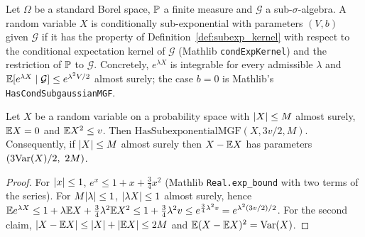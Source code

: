 \begin{definition}\label{def:subexp_cond}
\leanok
{}
Let $\Omega$ be a standard Borel space, $\mathbb{P}$ a finite measure and $\mathcal G$ a
sub-$\sigma$-algebra. A random variable $X$ is conditionally sub-exponential with parameters
$(V,b)$ given $\mathcal G$ if it has the property of Definition~\ref{def:subexp_kernel} with
respect to the conditional expectation kernel of $\mathcal G$ (Mathlib
\texttt{condExpKernel}) and the restriction of $\mathbb{P}$ to $\mathcal G$. Concretely,
$e^{\lambda X}$ is integrable for every admissible $\lambda$ and
$\mathbb{E}[e^{\lambda X}\mid\mathcal G] \le e^{\lambda^2V/2}$ almost surely; the case $b = 0$ is
Mathlib's \texttt{HasCondSubgaussianMGF}.
\end{definition}

\begin{lemma}\label{lem:bernstein_condition}
\leanok
{}
Let $X$ be a random variable on a probability space with $\lvert X \rvert \le M$ almost surely,
$\mathbb{E} X = 0$ and $\mathbb{E} X^2 \le v$. Then $\mathrm{HasSubexponentialMGF}(X, 3v/2, M)$.
Consequently, if $\lvert X \rvert \le M$ almost surely then $X - \mathbb{E} X$ has parameters
$(3\mathrm{Var}(X)/2,\ 2M)$.
\end{lemma}

\begin{proof}
\leanok
{}
For $\lvert x \rvert \le 1$, $e^x \le 1 + x + \frac34x^2$ (Mathlib \texttt{Real.exp\_bound} with two
terms of the series). For $M\lvert \lambda \rvert \le 1$, $\lvert \lambda X \rvert \le 1$ almost surely, hence
$\mathbb{E} e^{\lambda X} \le 1 + \lambda\mathbb{E} X + \frac34\lambda^2\mathbb{E} X^2 \le 1 + \frac34\lambda^2 v
\le e^{\frac34\lambda^2v} = e^{\lambda^2(3v/2)/2}$. For the second claim,
$\lvert X - \mathbb{E} X \rvert \le \lvert X \rvert + \lvert \mathbb{E} X \rvert \le 2M$ and $\mathbb{E}(X-\mathbb{E} X)^2 = \mathrm{Var}(X)$.
\end{proof}


